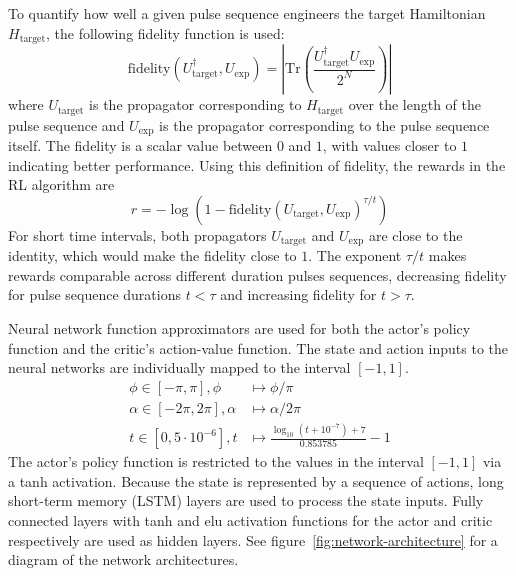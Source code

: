 \documentclass{article}
\begin{document}
To quantify how well a given pulse sequence engineers the target Hamiltonian $H_\text{target}$, the following fidelity function is used:
\begin{equation}\label{eq:fidelity}
    \text{fidelity}(U_\text{target}^\dagger, U_\text{exp}) = \left| \text{Tr}\left( \frac{U_\text{target}^\dagger U_\text{exp}}{2^N} \right) \right|
\end{equation}
where $U_\text{target}$ is the propagator corresponding to $H_\text{target}$ over the length of the pulse sequence and $U_\text{exp}$ is the propagator corresponding to the pulse sequence itself. The fidelity is a scalar value between $0$ and $1$, with values closer to $1$ indicating better performance. Using this definition of fidelity, the rewards in the RL algorithm are
\begin{equation}\label{eq:rewards}
    r = -\log\left( 1- \text{fidelity}(U_\text{target}, U_\text{exp})^{\tau/t} \right)
\end{equation}
For short time intervals, both propagators $U_\text{target}$ and $U_\text{exp}$ are close to the identity, which would make the fidelity close to $1$. The exponent $\tau/t$ makes rewards comparable across different duration pulses sequences, decreasing fidelity for pulse sequence durations $t<\tau$ and increasing fidelity for $t>\tau$.

Neural network function approximators are used for both the actor's policy function and the critic's action-value function. The state and action inputs to the neural networks are individually mapped to the interval $[-1,1]$.
\begin{align}
    \phi \in [-\pi, \pi], \phi      &\mapsto \phi / \pi \\
    \alpha \in [-2\pi,2\pi],\alpha  &\mapsto \alpha / 2\pi \\
    t \in [0,5\cdot10^{-6}], t      &\mapsto
        \frac{\log_{10}(t + 10^{-7}) + 7}{0.853785} - 1
\end{align}
The actor's policy function is restricted to the values in the interval $[-1,1]$ via a tanh activation.
Because the state is represented by a sequence of actions, long short-term memory (LSTM) layers are used to process the state inputs\cite{lstm}. Fully connected layers with tanh and elu activation functions for the actor and critic respectively are used as hidden layers. See figure~\ref{fig:network-architecture} for a diagram of the network architectures.
\end{document}
